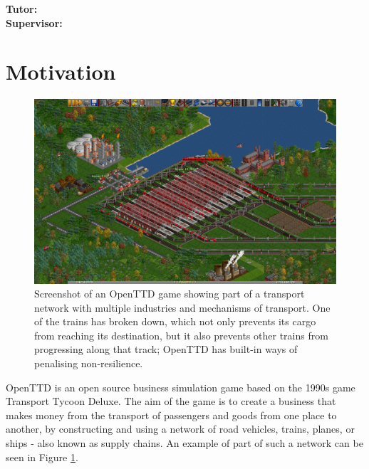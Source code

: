 \documentclass[a4paper,11pt]{article}
\begin{document}
\vfill
{\bf Tutor:} \tutor\\
{\bf Supervisor:} \supervisor
\newpage

\setcounter{page}{1}                            %
\footruleheight{1pt}
\headruleheight{1pt}
\rhead{- \thepage}
\cfoot{}
%


\section{Motivation}

\begin{figure}[h]
\centering
\includegraphics[width=\textwidth]{transport-tycoon-screenshot.png}
\caption{Screenshot of an OpenTTD game showing part of a transport network with multiple industries and mechanisms of transport. One of the trains has broken down, which not only prevents its cargo from reaching its destination, but it also prevents other trains from progressing along that track; OpenTTD has built-in ways of penalising non-resilience.}
\label{fig:network}
\end{figure}

OpenTTD is an open source business simulation game based on the 1990s game Transport Tycoon Deluxe. The aim of the game is to create a business that makes money from the transport of passengers and goods from one place to another, by constructing and using a network of road vehicles, trains, planes, or ships - also known as supply chains. An example of part of such a network can be seen in Figure \ref{fig:network}.
\end{document}
